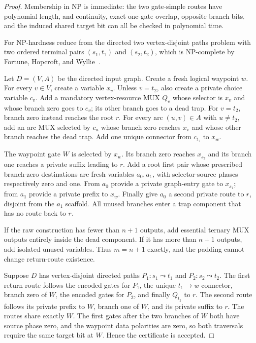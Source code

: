 \documentclass[11pt]{article}
\begin{document}
\begin{proof}
Membership in NP is immediate: the two gate-simple routes have polynomial
length, and continuity, exact one-gate overlap, opposite branch bits, and the
induced shared target bit can all be checked in polynomial time.

For NP-hardness reduce from the directed two vertex-disjoint paths problem
with two ordered terminal pairs $(s_1,t_1)$ and $(s_2,t_2)$, which is
NP-complete by Fortune, Hopcroft, and Wyllie~\cite{FHW1980}.

Let $D=(V,A)$ be the directed input graph.  Create a fresh logical waypoint
$w$.  For every $v\in V$, create a variable $x_v$.  Unless $v=t_2$, also
create a private choice variable $c_v$.  Add a mandatory vertex-resource MUX
$Q_v$ whose selector is $x_v$ and whose branch zero goes to $c_v$; its other
branch goes to a dead trap.  For $v=t_2$, branch zero instead reaches the root
$r$.  For every arc $(u,v)\in A$ with $u\ne t_2$, add an arc MUX selected by
$c_u$ whose branch zero reaches $x_v$ and whose other branch reaches the dead
trap.  Add one unique connector from $c_{t_1}$ to $x_w$.

The waypoint gate $W$ is selected by $x_w$.  Its branch zero reaches
$x_{s_2}$ and its branch one reaches a private suffix leading to $r$.  Add a
root first pair whose prescribed branch-zero destinations are fresh variables
$a_0,a_1$, with selector-source phases respectively zero and one.  From $a_0$
provide a private graph-entry gate to $x_{s_1}$; from $a_1$ provide a private
prefix to $x_w$.  Finally give $a_0$ a second private route to $r$, disjoint
from the $a_1$ scaffold.  All unused branches enter a trap component that has
no route back to $r$.

If the raw construction has fewer than $n+1$ outputs, add essential ternary
MUX outputs entirely inside the dead component.  If it has more than $n+1$
outputs, add isolated unused variables.  Thus $m=n+1$ exactly, and the padding
cannot change return-route existence.

Suppose $D$ has vertex-disjoint directed paths $P_1:s_1\leadsto t_1$ and
$P_2:s_2\leadsto t_2$.  The first return route follows the encoded gates for
$P_1$, the unique $t_1\to w$ connector, branch zero of $W$, the encoded gates
for $P_2$, and finally $Q_{t_2}$ to $r$.  The second route follows its private
prefix to $W$, branch one of $W$, and its private suffix to $r$.  The routes
share exactly $W$.  The first gates after the two branches of $W$ both have
source phase zero, and the waypoint data polarities are zero, so both
traversals require the same target bit at $W$.  Hence the certificate is
accepted.


\end{proof}
\end{document}
